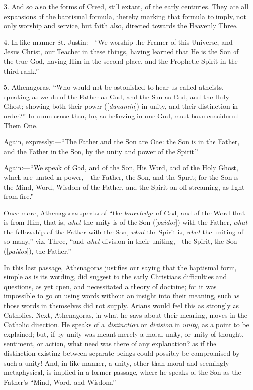 3. And so also the forms of Creed, still extant, of the early
centuries. They are all expansions of the baptismal formula, thereby
marking that formula to imply, not only worship and service, but faith
also, directed towards the Heavenly Three.

4. In like manner St. Justin:—``We worship the Framer of this
Universe, and Jesus Christ, our Teacher in these things, having
learned that He is the Son of the true God, having Him in the second
place, and the Prophetic Spirit in the third rank.''

5. Athenagoras. ``Who would not be astonished to hear us called
atheists, speaking as we do of the Father as God, and the Son as God,
and the Holy Ghost; showing both their power ([\emph{dunamin}]) in
unity, and their distinction in order?'' In some sense then, he, as
believing in one God, must have considered Them One.

Again, expressly:—``The Father and the Son are One: the Son
is in the Father, and the Father in the Son, by the unity and power of
the Spirit.''

Again:—``We speak of God, and of the Son, His Word, and of
the Holy Ghost, which are united in power,—the Father, the Son, and
the Spirit; for the Son is the Mind, Word, Wisdom of the Father, and
the Spirit an off-streaming, as light from fire.''

Once more, Athenagoras speaks of ``the \emph{knowledge} of God,
and of the Word that is from Him, that is, \emph{what} the unity is of
the Son ([\emph{paidos}]) with the Father, \emph{what} the fellowship of the Father with the Son, \emph{what} the Spirit is, \emph{what}
the uniting of so many,'' viz. Three, ``and \emph{what}
division in their uniting,—the Spirit, the Son ([\emph{paidos}]),
the Father.''

In this last passage, Athenagoras justifies our saying that the
baptismal form, simple as is its wording, did suggest to the early
Christians difficulties and questions, as yet open, and necessitated a
theory of doctrine; for it was impossible to go on using words without
an insight into their meaning, such as those words in themselves did
not supply. Arians would feel this as strongly as Catholics. Next,
Athenagoras, in what he says about their meaning, moves in the
Catholic direction. He speaks of a \emph{distinction} or \emph{division}
in \emph{unity}, as a point to be explained; but, if by unity was
meant merely a moral unity, or unity of thought, sentiment, or action,
what need was there of any explanation? as if the distinction existing
between separate beings could possibly be compromised by such a unity!
And, in like manner, a unity, other than moral and seemingly
metaphysical, is implied in a former passage, where he speaks of the
Son as the Father's ``Mind, Word, and Wisdom.''


